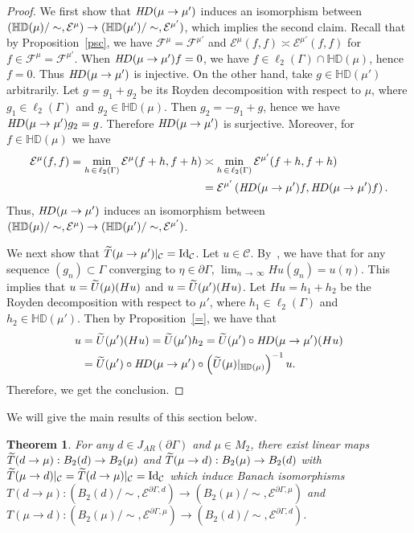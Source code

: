 \documentclass[10pt]{amsart}
\newtheorem{theo}{Theorem}[section]
\theoremstyle{definition}\newtheorem{defi}[theo]{Definition}\newtheorem{rema}[theo]{Remark}\newtheorem{exam}[theo]{Example}\newtheorem{exem}[theo]{Example}\newtheorem{nota}[theo]{Notation}
\newcommand{\ce}{\mathcal{E}}
\newcommand{\cf}{\mathcal{F}}
\newcommand{\cC}{\mathcal{C}}
\newcommand{\bHD}{\mathbb{HD}}
\newcommand{\rmId}{\mathrm{Id}}
\let\oldtilde\tilde
\renewcommand*{\tilde}[1]{\mathchoice{\widetilde{#1}}{\widetilde{#1}}{\oldtilde{#1}}{\oldtilde{#1}}}
\begin{document}
\begin{proof}
We first show that ${\textit HD}(\mu\rightarrow\mu')$ induces an isomorphism between $(\bHD(\mu)\linebreak/\sim,\ce^{\mu})\rightarrow(\bHD(\mu')/\sim,\ce^{\mu'})$, which implies the second claim. Recall that by Proposition~\ref{psc}, we have $\cf^{\mu}=\cf^{\mu'}$ and $\ce^{\mu}(f,f)\asymp\ce^{\mu'}(f,f)$ for $f\in\cf^{\mu}=\cf^{\mu'}$. When ${\textit HD}(\mu\rightarrow\mu')f=0$, we have $f\in\ell_2(\Gamma)\cap\bHD(\mu)$, hence $f=0$. Thus ${\textit HD}(\mu\rightarrow\mu')$ is injective. On the other hand, take $g\in\bHD(\mu')$ arbitrarily. Let $g=g_1+g_2$ be its Royden decomposition with respect to $\mu$, where $g_1\in\ell_2(\Gamma)$ and $g_2\in\bHD(\mu)$. Then $g_2=-g_1+g$, hence we have ${\textit HD}(\mu\rightarrow\mu')g_2=g$. Therefore ${\textit HD}(\mu\rightarrow\mu')$ is surjective. Moreover, for $f\in\bHD(\mu)$ we have
\begin{align*}
\ce^{\mu}(f,f)=\min_{h\,\in\,\ell_2(\Gamma)}\ce^{\mu}(f+h,f+h)&\asymp
\min_{h\,\in\,\ell_2(\Gamma)}\ce^{\mu'}(f+h,f+h)\\
&=\ce^{\mu'}\left({\textit HD}(\mu\rightarrow\mu')f,{\textit HD}(\mu\rightarrow\mu')f\right).
\end{align*}
Thus, ${\textit HD}(\mu\rightarrow\mu')$ induces an isomorphism between $(\bHD(\mu)/\sim,\ce^{\mu})\rightarrow(\bHD(\mu')/\linebreak \sim,\ce^{\mu'})$.

We next show that $\tilde{T}(\mu\to\mu')|_\cC=\rmId_\cC$. Let $u\in\cC$. By~\cite[Lemma~2.2]{Ka}, we have that for any sequence $(g_n)\subset\Gamma$ converging to $\eta\in\partial\Gamma$, $\lim_{n\,\to\,\infty}Hu(g_n)=u(\eta)$. This implies that $u=\tilde{U}(\mu)(Hu)$ and $u=\tilde{U}(\mu')(Hu)$. Let $Hu=h_1+h_2$ be the Royden decomposition with respect to $\mu'$, where $h_1\in\ell_2(\Gamma)$ and $h_2\in\bHD(\mu')$. Then by Proposition~\ref{=}, we have that
\begin{align*}
u&=\tilde{U}(\mu')(Hu)=\tilde{U}(\mu')h_2 =\tilde{U}(\mu')\circ {\textit HD}(\mu\rightarrow\mu')(Hu)\\
&=\tilde{U}(\mu')\circ {\textit HD}(\mu\rightarrow\mu')\circ \left(\tilde{U}(\mu)|_{\bHD(\mu)}\right)^{-1}u.
\end{align*}
Therefore, we get the conclusion.
\end{proof}


We will give the main results of this section below.

\begin{theo}\label{iso}
For any $d\in J_{AR}(\partial \Gamma)$ and $\mu\in M_2$, there exist linear maps $\tilde{T}(d\rightarrow\mu): B_2(d)\rightarrow B_2(\mu)$ and $\tilde{T}(\mu\rightarrow d):B_2(\mu)\rightarrow B_2(d)$ with $\tilde{T}(\mu\to d)|_\cC=\tilde{T}(d\to\mu)|_\cC=\rmId_\cC$ which induce Banach isomorphisms $T(d\rightarrow\mu): (B_2(d)/\sim,\ce^{\partial\Gamma,d})\rightarrow(B_2(\mu)/\sim,\ce^{\partial\Gamma,\mu})$ and $T(\mu\rightarrow d):(B_2(\mu)/\sim,\ce^{\partial\Gamma,\mu})\rightarrow (B_2(d)/\sim,\ce^{\partial\Gamma,d})$.
\end{theo}
\end{document}
